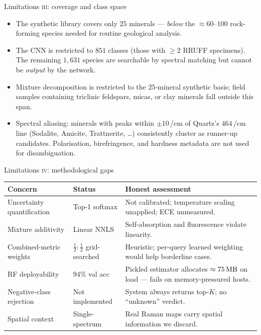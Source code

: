 \documentclass[10pt,aspectratio=169,xcolor=dvipsnames]{beamer}
\newcommand{\cmone}{\si{\per\centi\meter}}
\begin{document}
\begin{frame}{Limitations \textsc{iii}: coverage and class space}
  \begin{itemize}\setlength\itemsep{0.4em}
    \item The synthetic library covers only $25$ minerals — \emph{below}
          the $\approx 60$–$100$ rock-forming species needed for routine
          geological analysis.
    \item The CNN is restricted to $851$ classes (those with
          $\geq 2$ RRUFF specimens). The remaining $1{,}631$ species are
          searchable by spectral matching but cannot be \emph{output} by
          the network.
    \item Mixture decomposition is restricted to the $25$-mineral
          synthetic basis; field samples containing triclinic feldspars,
          micas, or clay minerals fall outside this span.
    \item Spectral aliasing: minerals with peaks within $\pm 10\,\cmone$
          of Quartz's $464\,\cmone$ line (Sodalite, Amicite, Trattnerite, …)
          consistently cluster as runner-up candidates. Polarisation,
          birefringence, and hardness metadata are not used for
          disambiguation.
  \end{itemize}
\end{frame}

\begin{frame}{Limitations \textsc{iv}: methodological gaps}
  \begin{table}\centering\small
    \begin{tabular}{@{}p{}p{}p{}@{}}
      \toprule
      \textbf{Concern} & \textbf{Status} & \textbf{Honest assessment}\\
      \midrule
      Uncertainty quantification & Top-1 softmax &
        Not calibrated; temperature scaling unapplied; ECE unmeasured.\\
      Mixture additivity & Linear NNLS &
        Self-absorption and fluorescence violate linearity.\\
      Combined-metric weights & $\tfrac{1}{2}{:}\tfrac{1}{2}$ grid-searched &
        Heuristic; per-query learned weighting would help borderline cases.\\
      RF deployability & $94\%$ val acc &
        Pickled estimator allocates $\approx \SI{75}{\mega\byte}$ on load — fails on memory-pressured hosts.\\
      Negative-class rejection & Not implemented &
        System always returns top-$K$; no ``unknown'' verdict.\\
      Spatial context & Single-spectrum &
        Real Raman maps carry spatial information we discard.\\
      \bottomrule
    \end{tabular}
  \end{table}
\end{frame}
\end{document}
